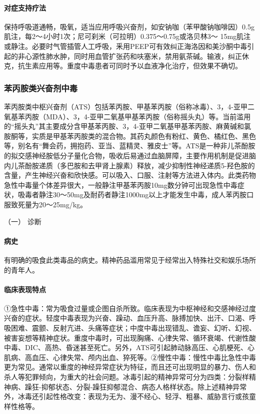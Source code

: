 \paragraph{对症支持疗法}

保持呼吸道通畅，吸氧，适当应用呼吸兴奋剂，如安钠咖（苯甲酸钠咖啡因）0.5g肌注，每2～4小时1次；尼可刹米（可拉明）0.375～0.75g或洛贝林3～
15mg肌注或静注。必要时气管插管人工呼吸，釆用PEEP可有效纠正海洛因和美沙酮中毒引起的非心源性肺水肿，同时用血管扩张药和呋塞米，禁用氨茶碱。输液，纠正休克，抗生素应用等。重度中毒患者可同时予以血液净化治疗，但效果不确切。

\subsubsection{苯丙胺类兴奋剂中毒}

苯丙胺类中枢兴奋剂（ATS）包括苯丙胺、甲基苯丙胺（俗称冰毒）、3，4-亚甲二氧基苯丙胺（MDA）、3，4-亚甲二氧基甲基苯丙胺（俗称摇头丸）等。当前滥用的“摇头丸”其主要成分含甲基苯丙胺、3，4-亚甲二氧基甲基苯丙胺、麻黄碱和氯胺酮等，实质是甲基苯丙胺类的混合物。其药丸颜色有粉红、黄色、橘红色、黑色等，别名有“舞会药，拥抱药、亚当、蓝精灵、雅皮士”等。ATS是一种非儿茶酚胺的拟交感神经胺低分子量化合物，吸收后易通过血脑屏障，主要作用机制是促进脑内儿茶酚胺递质（多巴胺和去甲肾上腺素）释放，减少抑制性神经递质5-羟色胺的含量，产生神经兴奋和欣快感。可以吸入、口服、注射等方法进入体内。此类药物急性中毒量个体差异很大，一般静注甲基苯丙胺10mg数分钟可出现急性中毒症状，吸毒者静注30～50mg及耐药者静注1000mg以上才能发生中毒，成人苯丙胺口服致死量为20～25mg/kg。

\hypertarget{text00131.htmlux5cux23CHP5-2-1-2-1}{}
（一） 诊断

\paragraph{病史}

有明确的吸食此类毒品的病史。精神药品滥用常见于经常出入特殊社交和娱乐场所的青年人。

\paragraph{临床表现特点}

①急性中毒：常为吸食过量或企图自杀所致。临床表现为中枢神经和交感神经过度兴奋的症状。轻度中毒表现为兴奋、躁动、血压升高、脉搏加快、出汗、口渴、呼吸困难、震颤、反射亢进、头痛等症状；中度中毒出现错乱、谵妄、幻听、幻视、被害妄想等精神症状。重度中毒时，可出现胸痛、心律失常、循环衰竭、代谢性酸中毒、DIC、高热、昏迷甚至死亡。另外，ATS可引起肺动脉高压、心肌梗死、心肌病、高血压、心律失常、颅内出血、猝死等。②慢性中毒：慢性中毒比急性中毒更为常见。通常以重度的神经异常症状为特征，而且还可出现明显的暴力、伤人和杀人等犯罪倾向，为重大的社会问题。冰毒引起的精神异常可分为四类：分裂样精神病、躁狂-抑郁状态、分裂-躁狂抑郁混合、病态人格样状态。除上述精神异常外，冰毒还引起性格改变：表现为无为、漫不经心、轻浮、粗暴、威胁言行或孩童样性格等。

